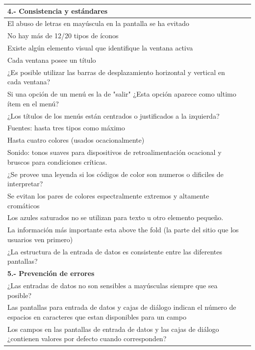 \documentclass[stu, 12pt, letterpaper, donotrepeattitle, floatsintext, natbib]{apa7}
\begin{document}
\begin{longtable}{|>{\raggedright\arraybackslash}p{10cm}|>{\centering\arraybackslash}p{3cm}|}
    \textbf{4.- Consistencia y estándares} & \\ \hline
    El abuso de letras en mayúscula en la pantalla se ha evitado & \\ \hline
    No hay más de 12/20 tipos de íconos & \\ \hline
    Existe algún elemento visual que identifique la ventana activa & \\ \hline
    Cada ventana posee un título & \\ \hline
    ¿Es posible utilizar las barras de desplazamiento horizontal y vertical en cada ventana? & \\ \hline
    Si una opción de un menú es la de "salir" ¿Esta opción aparece como ultimo ítem en el menú? & \\ \hline
    ¿Los títulos de los menús están centrados o justificados a la izquierda? & \\ \hline
    Fuentes: hasta tres tipos como máximo & \\ \hline
    Hasta cuatro colores (usados ocacionalmente)  & \\ \hline
    Sonido: tonos suaves para dispositivos de retroalimentación ocacional y bruscos para condiciones críticas. & \\ \hline
    ¿Se provee una leyenda si los códigos de color son numeros o dificiles de interpretar?  & \\ \hline
    Se evitan los pares de colores espectralmente extremos y altamente  cromáticos & \\ \hline
    Los azules saturados no se utilizan para texto u otro elemento pequeño. & \\ \hline
    La información más importante esta above the fold (la parte del sitio que los usuarios ven primero) & \\ \hline
    ¿La estructura de la entrada de datos es  consistente entre las diferentes pantallas? & \\ \hline

    \textbf{5.- Prevención de errores} & \\ \hline
    ¿Las entradas de datos no son sensibles a mayúsculas siempre que sea posible? & \\ \hline
    Las pantallas para entrada de datos y cajas de diálogo indican el número de espacios en caracteres que estan disponibles para un campo & \\ \hline
    Los campos en las pantallas de entrada de datos y las cajas de diálogo ¿contienen valores por defecto cuando corresponden? & \\ \hline



\end{longtable}
\end{document}
